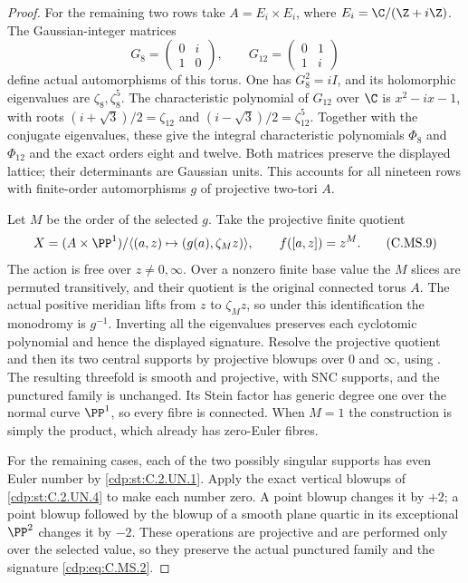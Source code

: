 \begin{proof}
For the remaining two rows take
$A=E_i\times E_i$, where
$E_i=\C/(\Z+i\Z)$. The Gaussian-integer
matrices
\[
 G_8=\begin{pmatrix}0&i\\1&0\end{pmatrix},
 \qquad
 G_{12}=\begin{pmatrix}0&1\\1&i\end{pmatrix}
 \tag{C.MS.8}\label{cdp:eq:C.MS.8}
\]
define actual automorphisms of this torus.
One has $G_8^2=iI$, and its holomorphic
eigenvalues are $\zeta_8,\zeta_8^5$.
The characteristic polynomial of $G_{12}$
over $\C$ is $x^2-ix-1$, with roots
$(i+\sqrt3)/2=\zeta_{12}$ and
$(i-\sqrt3)/2=\zeta_{12}^5$.
Together with the conjugate eigenvalues,
these give the integral characteristic
polynomials $\Phi_8$ and $\Phi_{12}$ and
the exact orders eight and twelve.
Both matrices preserve the displayed lattice;
their determinants are Gaussian units.
This accounts for all nineteen rows with
finite-order automorphisms $g$ of projective
two-tori $A$.

Let $M$ be the order of the selected $g$.
Take the projective finite quotient
\[
 X=(A\times\PP^1)/
       \langle(a,z)\mapsto(g(a),\zeta_Mz)\rangle,
 \qquad f([a,z])=z^M.                           \tag{C.MS.9}\label{cdp:eq:C.MS.9}
\]
The action is free over $z\ne0,\infty$.
Over a nonzero finite base value the $M$
slices are permuted transitively, and their
quotient is the original connected torus $A$.
The actual positive meridian lifts from $z$
to $\zeta_Mz$, so under this identification
the monodromy is $g^{-1}$. Inverting all
the eigenvalues preserves each cyclotomic
polynomial and hence the displayed signature.
Resolve the projective quotient and then its
two central supports by projective blowups
over $0$ and $\infty$, using
\cite[Theorem~1.6]{BierstoneMilman1997}.
The resulting threefold is smooth and projective,
with SNC supports, and the punctured family is
unchanged. Its Stein factor has generic
degree one over the normal curve $\PP^1$,
so every fibre is connected. When $M=1$
the construction is simply the product,
which already has zero-Euler fibres.

For the remaining cases, each of the two
possibly singular supports has even Euler
number by \ref{cdp:st:C.2.UN.1}. Apply the exact vertical
blowups of \ref{cdp:st:C.2.UN.4} to make each number
zero. A point blowup changes it by $+2$;
a point blowup followed by the blowup of
a smooth plane quartic in its exceptional
$\PP^2$ changes it by $-2$. These
operations are projective and are performed
only over the selected value, so they
preserve the actual punctured family and
the signature \eqref{cdp:eq:C.MS.2}.


\end{proof}
